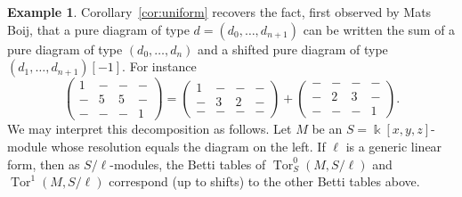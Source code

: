 \documentclass[12pt]{amsart}
\theoremstyle{definition}
\newtheorem{example}[lemma]{Example}
\theoremstyle{remark}
\newcommand{\Tor}{\operatorname{Tor}}
\newcommand{\kk}{\Bbbk}
\begin{document}
\begin{example}
Corollary~\ref{cor:uniform} recovers the fact, first observed by Mats Boij, that a pure diagram of type $d=(d_0, \dots, d_{n+1})$ can be written the sum of a pure diagram of type $(d_0, \dots, d_n)$ and a shifted pure diagram of type $(d_1, \dots, d_{n+1})[-1]$.  For instance
\[
\begin{pmatrix}
1&-&-&-\\
-&5&5&-\\
-&-&-&1
\end{pmatrix}
=
\begin{pmatrix}
1&-&-&-\\
-&3&2&-\\
-&-&-&-
\end{pmatrix}
+
\begin{pmatrix}
-&-&-&-\\
-&2&3&-\\
-&-&-&1
\end{pmatrix}.
\]
We may interpret this decomposition as follows.  Let $M$ be an $S=\kk[x,y,z]$-module whose resolution equals the diagram on the left. If $\ell$ is a generic linear form, then as $S/\ell$-modules, the Betti tables of $\Tor^0_S(M,S/\ell)$ and $\Tor^1(M,S/\ell)$ correspond (up to shifts) to the other Betti tables above.
\end{example}
\end{document}
